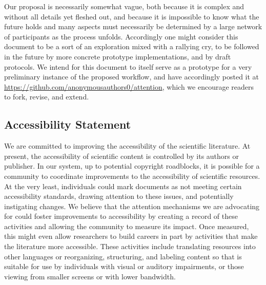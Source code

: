 \documentclass{article} %
\begin{document}
Our proposal is necessarily somewhat vague, both because it is complex
and without all details yet fleshed out, and because it is impossible
to know what the future holds and many aspects must necessarily be
determined by a large network of participants as the process unfolds.
Accordingly one might consider this document to be a sort of an exploration mixed with a rallying cry,
to be followed in the future by more concrete prototype implementations, and by draft protocols.
We intend for this document to itself serve as a prototype for a very preliminary instance of the proposed workflow,
and have accordingly posted it at \url{https://github.com/anonymousauthors0/attention},
which we encourage readers to fork, revise, and extend.

\subsection{Accessibility Statement}



We are committed to improving the accessibility of the scientific literature. 
At present, the accessibility of scientific content is controlled by its authors or publisher. 
In our system, up to potential copyright roadblocks, it is possible for a community to coordinate improvements to the accessibility of scientific resources. At the very least, individuals could mark documents as not meeting certain accessibility standards, drawing attention to these issues, and potentially instigating changes.
We believe that the attention mechanisms we are advocating for
could foster improvements to accessibility by creating a record of these activities and
allowing the community to measure its impact. 
Once measured, this might even allow researchers to build careers in part by activities that make the literature more accessible.
These activities include translating resources into other languages or 
reorganizing, structuring, and labeling content so that is suitable for use by individuals with visual or auditory impairments, or those viewing from smaller screens or with lower bandwidth.
\end{document}

